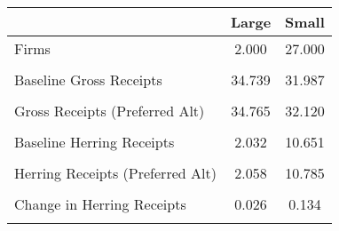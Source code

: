 \begin{tabular}{l*{2}{c}}
\hline\hline
                &    Large&    Small\\
\hline
Firms           &    2.000&   27.000\\
                &         &         \\
Baseline Gross Receipts&   34.739&   31.987\\
                &         &         \\
Gross Receipts (Preferred Alt)&   34.765&   32.120\\
                &         &         \\
Baseline Herring Receipts&    2.032&   10.651\\
                &         &         \\
Herring Receipts  (Preferred Alt)&    2.058&   10.785\\
                &         &         \\
Change in Herring Receipts&    0.026&    0.134\\
                &         &         \\
\hline\hline
\end{tabular}

